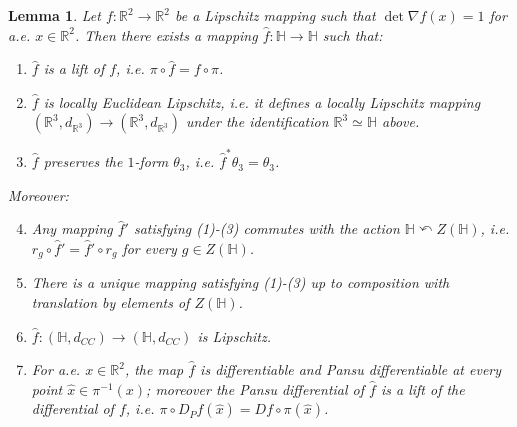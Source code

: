 \documentclass[titlepage]{amsart}
\numberwithin{equation}{section}
\theoremstyle{plain}
\newtheorem{lemma}[equation]{Lemma}
\theoremstyle{definition}
\theoremstyle{remark}
\newcommand{\ben}{\begin{enumerate}}
\newcommand{\een}{\end{enumerate}}
\renewcommand{\H}{\mathbb{H}}
\newcommand{\R}{\mathbb{R}}
\newcommand{\ra}{\rightarrow}
\renewcommand{\th}{\theta}
\newcommand{\g}{\nabla }
\begin{document}
\begin{lemma}
\label{lem_lifting}
Let $f:\R^2\ra\R^2$ be a Lipschitz mapping such that $\det \g f(x)=1$ for a.e. $x\in \R^2$.  Then there exists a mapping $\hat f:\H\ra\H$ such that:
\ben
\item $\hat f$ is a lift of $f$, i.e. $\pi\circ\hat f=f\circ \pi$.
\item $\hat f$ is locally Euclidean Lipschitz, i.e. it defines a locally Lipschitz mapping $(\R^3,d_{\R^3})\ra(\R^3,d_{\R^3})$ under the identification $\R^3\simeq \H$ above. 
\item $\hat f$ preserves the $1$-form $\th_3$, i.e. $\hat f^*\th_3=\th_3$.  
\een
Moreover:
\ben
\setcounter{enumi}{3}
\item  Any mapping $\hat f'$ satisfying (1)-(3) commutes with the action $\H\curvearrowleft Z(\H)$, i.e. $r_g\circ \hat f'=\hat f'\circ r_g$ for every  $g\in Z(\H)$.
\item There is a unique mapping satisfying (1)-(3) up to composition with translation by elements of $Z(\H)$.
\item $\hat f:(\H,d_{CC})\ra (\H,d_{CC})$ is Lipschitz.
\item For a.e. $x\in \R^2$, the map $\hat f$ is differentiable and Pansu differentiable at every point $\hat x\in \pi^{-1}(x)$; moreover the Pansu differential of $\hat f$ is a lift of the differential of $f$, i.e.   $\pi\circ D_P\hat{f}(\hat x)=Df\circ \pi(\hat{x})$.  
\een
\end{lemma}
\end{document}
